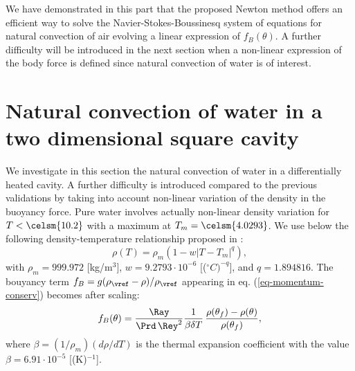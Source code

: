 We have demonstrated in this part that the proposed Newton method offers an efficient way to solve the Navier-Stokes-Boussinesq system of equations for natural convection of air evolving a linear expression of $f_B(\theta)$.
A further difficulty will be introduced in the next section when a non-linear expression of the body force is defined since natural convection of water is of interest.

\section{Natural convection of water in a two dimensional square cavity}\label{sec: natconv-water}
We investigate in this section the natural convection of water in a differentially heated cavity. 
A further difficulty is introduced compared to the previous validations by taking into account non-linear variation of the density in the buoyancy force.
Pure water involves actually non-linear density variation for $T< \celsm{10.2}$ with a maximum at $T_m= \celsm{4.0293}$. 
We use below the following density-temperature relationship  proposed in \cite{Gebhart1977}:
\begin{equation}\label{eq-dens-nonlin}
\rho(T)=\rho_m \left(1 - w \left|T - T_m\right|^q\right),
\end{equation}
with $\rho_m=999.972$ [kg/m$^3$], $w=9.2793\cdot 10^{-6}$ [($^\circ C)^{-q}$], and $q=1.894816$.
The bouyancy term $f_B = g(\rho_\vref-\rho)/\rho_\vref$ appearing in eq. (\ref{eq-momentum-conserv})  becomes after scaling:
\begin{equation}
f_B(\theta) = \frac{\Ray}{\Prd \, \Rey^2} \frac{1}{\beta \delta T}\, \frac{\rho(\theta_f)-\rho(\theta)}{\rho(\theta_f)},
\label{eq-fBnonlin}
\end{equation}
where $\beta=(1/\rho_m) \left(d\rho/dT\right)$ is the thermal expansion coefficient with the value \cite{Scanlon2004} $\beta=6.91 \cdot 10^{-5}$ [(K)$^{-1}$].

